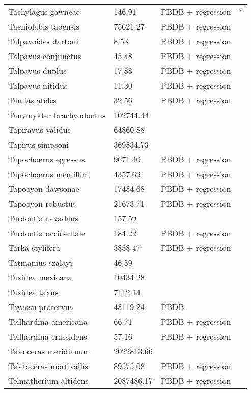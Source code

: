 \documentclass{article}
\begin{document}
\begin{center}
\begin{longtable}{p{} p{} p{} p{}}
    Tachylagus gawneae & 146.91 & PBDB + regression & * \\ 
    Taeniolabis taoensis & 75621.27 & PBDB + regression &  \\ 
    Talpavoides dartoni & 8.53 & PBDB + regression &  \\ 
    Talpavus conjunctus & 45.48 & PBDB + regression &  \\ 
    Talpavus duplus & 17.88 & PBDB + regression &  \\ 
    Talpavus nitidus & 11.30 & PBDB + regression &  \\ 
    Tamias ateles & 32.56 & PBDB + regression &  \\ 
    Tanymykter brachyodontus & 102744.44 & \cite{Tomiya2013} &  \\ 
    Tapiravus validus & 64860.88 & \cite{Tomiya2013} &  \\ 
    Tapirus simpsoni & 369534.73 & \cite{Tomiya2013} &  \\ 
    Tapochoerus egressus & 9671.40 & PBDB + regression &  \\ 
    Tapochoerus mcmillini & 4357.69 & PBDB + regression &  \\ 
    Tapocyon dawsonae & 17454.68 & PBDB + regression &  \\ 
    Tapocyon robustus & 21673.71 & PBDB + regression &  \\ 
    Tardontia nevadans & 157.59 & \cite{Tomiya2013} &  \\ 
    Tardontia occidentale & 184.22 & PBDB + regression &  \\ 
    Tarka stylifera & 3858.47 & PBDB + regression &  \\ 
    Tatmanius szalayi & 46.59 & \cite{Ferrusquia-Villafranca2006} &  \\ 
    Taxidea mexicana & 10434.28 & \cite{Bloch2007} &  \\ 
    Taxidea taxus & 7112.14 & \cite{Smith2004} &  \\ 
    Tayassu protervus & 45119.24 & PBDB &  \\ 
    Teilhardina americana & 66.71 & PBDB + regression &  \\ 
    Teilhardina crassidens & 57.16 & PBDB + regression &  \\ 
    Teleoceras meridianum & 2022813.66 & \cite{Tomiya2013} &  \\ 
    Teletaceras mortivallis & 89575.08 & PBDB + regression &  \\ 
    Telmatherium altidens & 2087486.17 & PBDB + regression &  \\ 

\end{longtable}
\end{center}
\end{document}
